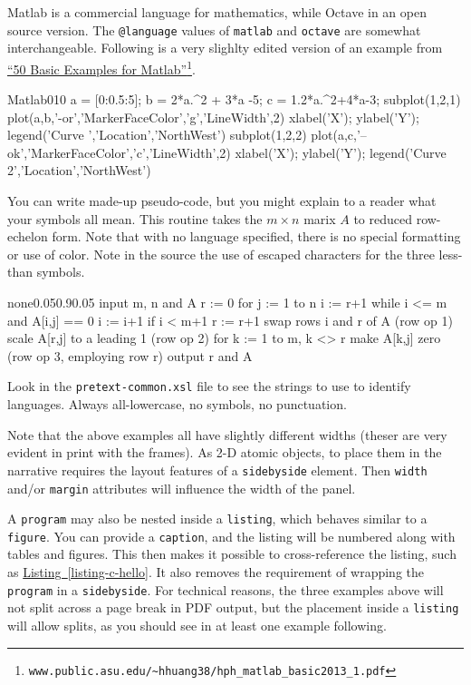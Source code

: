 \documentclass{amsart}
\theoremstyle{plain}%
\theoremstyle{definition}%
\theoremstyle{remark}%
\newcommand{\xreffont}{\relax}
\newcommand{\mono}[1]{\texttt{#1}}
\numberwithin{equation}{section}
\begin{document}
Matlab is a commercial language for mathematics, while Octave in an open source version.  The \mono{@language} values of \mono{matlab} and \mono{octave} are somewhat interchangeable.  Following is a very slighlty edited version of an example from \href{http://www.public.asu.edu/\~hhuang38/hph_matlab_basic2013_1.pdf}{``50 Basic Examples for Matlab''}\footnote{\nolinkurl{www.public.asu.edu/\~hhuang38/hph_matlab_basic2013_1.pdf}\label{section-programs-7-5}}.%
\begin{program}{Matlab}{0}{1}{0}
a = [0:0.5:5]; %
b = 2*a.^2 + 3*a -5;
c = 1.2*a.^2+4*a-3;
subplot(1,2,1)
plot(a,b,'-or','MarkerFaceColor','g','LineWidth',2)
xlabel('X'); ylabel('Y'); legend('Curve ','Location','NorthWest')
subplot(1,2,2)
plot(a,c,'--ok','MarkerFaceColor','c','LineWidth',2)
xlabel('X'); ylabel('Y'); legend('Curve 2','Location','NorthWest')
\end{program}
You can write made-up pseudo-code, but you might explain to a reader what your symbols all mean.  This routine takes the \(m\times n\) marix \(A\) to reduced row-echelon form.  Note that with no language specified, there is no special formatting or use of color.  Note in the source the use of escaped characters for the three less-than symbols.%
\begin{program}{none}{0.05}{0.9}{0.05}
input m, n and A
r := 0
for j := 1 to n
   i := r+1
   while i <= m and A[i,j] == 0
       i := i+1
   if i < m+1
       r := r+1
       swap rows i and r of A (row op 1)
       scale A[r,j] to a leading 1 (row op 2)
       for k := 1 to m, k <> r
           make A[k,j] zero (row op 3, employing row r)
output r and A
\end{program}
Look in the \mono{pretext-common.xsl} file to see the strings to use to identify languages.  Always all-lowercase, no symbols, no punctuation.%
\par
Note that the above examples all have slightly different widths (theser are very evident in print with the frames).  As 2-D atomic objects, to place them in the narrative requires the layout features of a \mono{sidebyside} element.  Then \mono{width} and\slash{}or \mono{margin} attributes will influence the width of the panel.%
\par
A \mono{program} may also be nested inside a \mono{listing}, which behaves similar to a \mono{figure}.  You can provide a \mono{caption}, and the listing will be numbered along with tables and figures.  This then makes it possible to cross-reference the listing, such as \hyperref[listing-c-hello]{Listing~{\xreffont\ref{listing-c-hello}}}.  It also removes the requirement of wrapping the \mono{program} in a \mono{sidebyside}.  For technical reasons, the three examples above will not split across a page break in PDF output, but the placement inside a \mono{listing} will allow splits, as you should see in at least one example following.%
\end{document}
